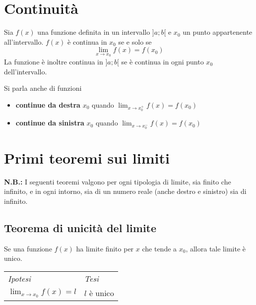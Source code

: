 \section{Continuità}
\begin{boxdef}
    Sia $f(x)$ una funzione definita in un intervallo $]a;b[$ e $x_0$ un punto appartenente all'intervallo. $f(x)$ è continua in $x_0$ se e solo se \[\lim_{x\to x_0}f(x)=f(x_0)\]
    La funzione è inoltre continua in $]a;b[$ se è continua in ogni punto $x_0$ dell'intervallo.
\end{boxdef}
Si parla anche di funzioni
\begin{itemize}
    \item \textbf{continue da destra} $x_0$ quando $\lim_{x\to x_0^+}f(x)=f(x_0)$
    \item \textbf{continue da sinistra} $x_0$ quando $\lim_{x\to x_0^-}f(x)=f(x_0)$
\end{itemize}
\section{Primi teoremi sui limiti}
\textbf{N.B.:} I seguenti teoremi valgono per ogni tipologia di limite, sia finito che infinito, e in ogni intorno, sia di un numero reale (anche destro e sinistro) sia di infinito.
    \subsection{Teorema di unicità del limite}
        \begin{shadedTheorem}
            Se una funzione $f(x)$ ha limite finito per $x$ che tende a $x_0$, allora tale limite è unico.
        \end{shadedTheorem}
        \begin{tabular}{m{}m{}}
            \textit{Ipotesi} & \textit{Tesi}  \\
            $\displaystyle\lim_{x\rightarrow x_0}f(x) = l$ & $l$ è unico
        \end{tabular}
        
